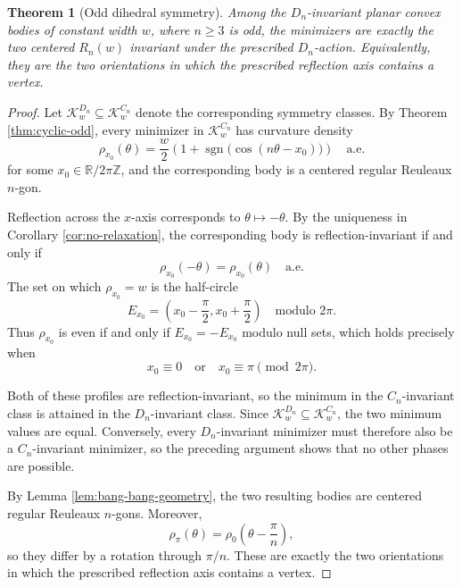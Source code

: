 \documentclass[11pt,letterpaper,reqno]{amsart}
\newtheorem{theorem}{Theorem}[section]
\begin{document}
\begin{theorem}[Odd dihedral symmetry]
Among the $D_n$-invariant planar convex bodies of constant width $w$, where $n \geq 3$ is odd, the minimizers are exactly the two centered $R_n(w)$ invariant under the prescribed $D_n$-action. Equivalently, they are the two orientations in which the prescribed reflection axis contains a vertex.
\end{theorem}

\begin{proof}
Let $\mathcal K_w^{D_n}\subseteq\mathcal K_w^{C_n}$ denote the
corresponding symmetry classes. By Theorem \ref{thm:cyclic-odd}, every minimizer in
$\mathcal K_w^{C_n}$ has curvature density
\[
\rho_{x_0}(\theta)
=
\frac{w}{2}
\left(1+\operatorname{sgn}\bigl(\cos(n\theta-x_0)\bigr)\right)
\quad\text{a.e.}
\]
for some $x_0\in\mathbb R/2\pi\mathbb Z$, and the corresponding body
is a centered regular Reuleaux $n$-gon.

Reflection across the $x$-axis corresponds to $\theta\mapsto-\theta$.
By the uniqueness in Corollary \ref{cor:no-relaxation}, the corresponding body is
reflection-invariant if and only if
\[
\rho_{x_0}(-\theta)=\rho_{x_0}(\theta)
\quad\text{a.e.}
\]
The set on which $\rho_{x_0}=w$ is the half-circle
\[
E_{x_0}
=
\left(x_0-\frac{\pi}{2},x_0+\frac{\pi}{2}\right)
\quad\text{modulo }2\pi.
\]
Thus $\rho_{x_0}$ is even if and only if
$E_{x_0}=-E_{x_0}$ modulo null sets, which holds precisely when
\[
x_0\equiv0
\quad\text{or}\quad
x_0\equiv\pi
\pmod{2\pi}.
\]

Both of these profiles are reflection-invariant, so the minimum in the
$C_n$-invariant class is attained in the $D_n$-invariant class. Since
$\mathcal K_w^{D_n}\subseteq\mathcal K_w^{C_n}$, the two minimum values
are equal. Conversely, every $D_n$-invariant minimizer must therefore
also be a $C_n$-invariant minimizer, so the preceding argument shows
that no other phases are possible.

By Lemma \ref{lem:bang-bang-geometry}, the two resulting bodies are centered regular Reuleaux
$n$-gons. Moreover,
\[
\rho_{\pi}(\theta)
=
\rho_0\left(\theta-\frac{\pi}{n}\right),
\]
so they differ by a rotation through $\pi/n$. These are exactly the two
orientations in which the prescribed reflection axis contains a vertex.
\end{proof}
\end{document}
